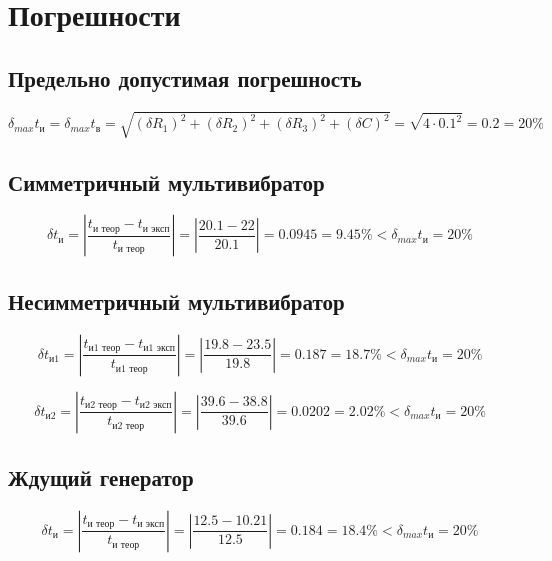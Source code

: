 \section{Погрешности}

\subsection{Предельно допустимая погрешность}

\begin{displaymath}
	\delta_{max} t_{\text{и}} = \delta_{max} t_{\text{в}} =\sqrt{(\delta R_1)^2 + (\delta R_2)^2 + (\delta R_3)^2 + (\delta C)^2} = \sqrt{4 \cdot 0.1^2} = 0.2 = 20 \%
\end{displaymath}

\subsection{Симметричный мультивибратор}

\begin{displaymath}
	\delta t_{\text{и}} = \left| \frac{t_{\text{и теор}} - t_{\text{и эксп}}}{t_{\text{и теор}}} \right| = \left| \frac{20.1 - 22}{20.1} \right| = 0.0945 = 9.45 \% < \delta_{max} t_{\text{и}} = 20 \%
\end{displaymath}

\subsection{Несимметричный мультивибратор}

\begin{displaymath}
	\delta t_{\text{и1}} = \left| \frac{t_{\text{и1 теор}} - t_{\text{и1 эксп}}}{t_{\text{и1 теор}}} \right| = \left| \frac{19.8 - 23.5}{19.8} \right| = 0.187 = 18.7 \% < \delta_{max} t_{\text{и}} = 20 \%
\end{displaymath}

\begin{displaymath}
	\delta t_{\text{и2}} = \left| \frac{t_{\text{и2 теор}} - t_{\text{и2 эксп}}}{t_{\text{и2 теор}}} \right| = \left| \frac{39.6 - 38.8}{39.6} \right| = 0.0202 = 2.02 \% < \delta_{max} t_{\text{и}} = 20 \%
\end{displaymath}

\subsection{Ждущий генератор}

\begin{displaymath}
	\delta t_{\text{и}} = \left| \frac{t_{\text{и теор}} - t_{\text{и эксп}}}{t_{\text{и теор}}} \right| = \left| \frac{12.5 - 10.21}{12.5} \right| = 0.184 = 18.4 \% < \delta_{max} t_{\text{и}} = 20 \%
\end{displaymath}

